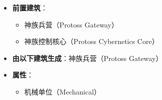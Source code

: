 \begin{tcolorbox}[colback=white, colframe=black!60!white, title=Protoss\_Dragoon(), arc=0mm]
\begin{itemize}
\begin{itemize}
            \end{itemize}
        \item \textbf{前置建筑}：
            \begin{itemize}
                \item 神族兵营（Protoss Gateway）
                \item 神族控制核心（Protoss Cybernetics Core）
            \end{itemize}
        \item \textbf{由以下建筑生成}：神族兵营（Protoss Gateway）
        \item \textbf{属性}：
            \begin{itemize}
                \item 机械单位（Mechanical）
            \end{itemize}
    \end{itemize}
\end{tcolorbox}

